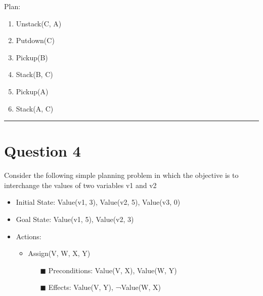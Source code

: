 \documentclass[11pt]{article}
\begin{document}
\begin{flushleft}
\begin{enumerate}[label=(\alph*)]
        \vspace{1em}Plan:
        \begin{enumerate}[label=\arabic*.]
            \item Unstack(C, A)
            \item Putdown(C)
            \item Pickup(B)
            \item Stack(B, C)
            \item Pickup(A)
            \item Stack(A, C)
        \end{enumerate}

\end{enumerate}

\rule[0.1pt]{40em}{1.0pt}

\section*{Question 4}
Consider the following simple planning problem in which the objective is to
interchange the values of two variables v1 and v2

\begin{itemize}
    \item Initial State: Value(v1, 3), Value(v2, 5), Value(v3, 0)
    \item Goal State: Value(v1, 5), Value(v2, 3)
    \item Actions:
        \begin{itemize}
            \item Assign(V, W, X, Y)
                \begin{itemize}
                    \item[$\blacksquare$] Preconditions: Value(V, X),
                        Value(W, Y)
                    \item[$\blacksquare$] Effects: Value(V,
                        Y), ¬Value(W, X)
                \end{itemize}
        \end{itemize}
\end{itemize}


\end{flushleft}
\end{document}
